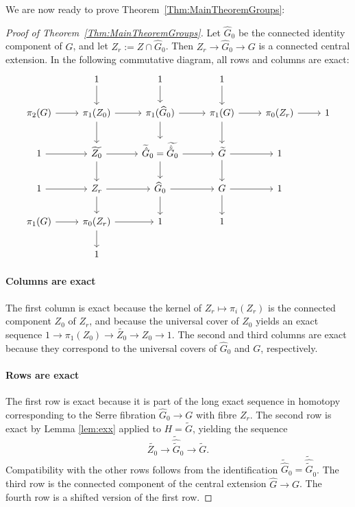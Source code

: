 \documentclass{article}
\theoremstyle{definition}
\begin{document}
We are now ready to prove Theorem~\ref{Thm:MainTheoremGroups}:



\begin{proof}[Proof of Theorem~\ref{Thm:MainTheoremGroups}]
Let $\widehat{G}_0$ be the connected identity component of $\widehat{G}$, and let $Z_r := Z \cap \widehat{G}_0$.
Then $Z_r \rightarrow \widehat{G}_{0} \rightarrow G$ is a connected central extension.
In the following commutative diagram, all rows and columns are exact:
\[
\begin{tikzcd}
		& 1 				& 1 											& 1 						& 			&   		\\
\pi_2(G) 	& \pi_1(Z_0) 		& \pi_1(\widehat{G}_{0}) 							& \pi_1(G) 				&\pi_0(Z_r) 	& 1		\\
1 		& \widetilde{Z_0}	&	\widetilde{\hat{G}}_0 = \widetilde{\hat{\tilde{G}}_0}	&\widetilde{G}				& 1			&		\\
1 		& Z_r			&	\widehat{G}_0								&		G				& 1			&		\\
\pi_1(G)	& \pi_0(Z_r)		&	1										&		1				& 			&		\\
		& 1				&											&						& 			&		
\arrow[from=2-1, to=2-2]
\arrow[from=2-2, to=2-3]
\arrow[from=2-3, to=2-4]
\arrow[from=2-4, to=2-5]
\arrow[from=2-5, to=2-6]
\arrow[from=3-1, to=3-2]
\arrow[from=3-2, to=3-3]
\arrow[from=3-3, to=3-4]
\arrow[from=3-4, to=3-5]
\arrow[from=4-1, to=4-2]
\arrow[from=4-2, to=4-3]
\arrow[from=4-3, to=4-4]
\arrow[from=4-4, to=4-5]
\arrow[from=5-1, to=5-2]
\arrow[from=5-2, to=5-3]
\arrow[from=1-2, to=2-2]
\arrow[from=2-2, to=3-2]
\arrow[from=3-2, to=4-2]
\arrow[from=4-2, to=5-2]
\arrow[from=5-2, to=6-2]
\arrow[from=1-3, to=2-3]
\arrow[from=2-3, to=3-3]
\arrow[from=3-3, to=4-3]
\arrow[from=4-3, to=5-3]
\arrow[from=1-4, to=2-4]
\arrow[from=2-4, to=3-4]
\arrow[from=3-4, to=4-4]
\arrow[from=4-4, to=5-4]
\end{tikzcd}
\]

\paragraph{Columns are exact}
The first column is exact because the kernel of $Z_r \mapsto \pi_i(Z_r)$ is the connected component $Z_0$ of $Z_r$, and 
because the universal cover of $Z_0$ yields an exact sequence
$1 \rightarrow \pi_1(Z_0) \rightarrow \widetilde{Z_0} \rightarrow Z_0 \rightarrow 1$.
The second and third columns are exact because they correspond to the universal covers of $\widehat{G}_0$ and $G$, respectively.
\paragraph{Rows are exact}
The first row is exact because it is part of the long exact sequence in homotopy corresponding to the Serre fibration $\widehat{G}_{0} \rightarrow G$ with fibre $Z_r$.
The second row is exact by Lemma \ref{lem:exx} applied to $H=\tilde G$, yielding the sequence 
\[\widetilde{Z_0} \to \tilde{\hat{\tilde G}}_0 \to \tilde G.\] 
Compatibility with the other rows follows from the identification ${\tilde{\hat{ G}}_0=\tilde{\hat{\tilde G}}}_0$. The third row is the connected component of 
the central extension $\widehat{G} \rightarrow G$. The fourth row is a shifted version of the first row.


\end{proof}
\end{document}
